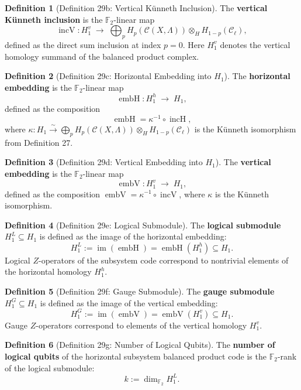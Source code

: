 \documentclass[11pt]{article}
\theoremstyle{plain}
\theoremstyle{definition}
\newtheorem*{definition}{Definition}
\theoremstyle{remark}
\begin{document}
\begin{definition}[Definition 29b: Vertical Künneth Inclusion]
The \textbf{vertical Künneth inclusion} is the $\mathbb{F}_2$-linear map
\[
  \operatorname{incV} : H_1^v \;\longrightarrow\; \bigoplus_{p} H_p(\mathcal{C}(X,\Lambda)) \otimes_H H_{1-p}(\mathcal{C}_\ell),
\]
defined as the direct sum inclusion at index $p = 0$. Here $H_1^v$ denotes the vertical homology summand of the balanced product complex.
\end{definition}

\begin{definition}[Definition 29c: Horizontal Embedding into $H_1$]
The \textbf{horizontal embedding} is the $\mathbb{F}_2$-linear map
\[
  \operatorname{embH} : H_1^h \;\longrightarrow\; H_1,
\]
defined as the composition
\[
  \operatorname{embH} = \kappa^{-1} \circ \operatorname{incH},
\]
where $\kappa : H_1 \xrightarrow{\sim} \bigoplus_p H_p(\mathcal{C}(X,\Lambda)) \otimes_H H_{1-p}(\mathcal{C}_\ell)$ is the Künneth isomorphism from Definition 27.
\end{definition}

\begin{definition}[Definition 29d: Vertical Embedding into $H_1$]
The \textbf{vertical embedding} is the $\mathbb{F}_2$-linear map
\[
  \operatorname{embV} : H_1^v \;\longrightarrow\; H_1,
\]
defined as the composition $\operatorname{embV} = \kappa^{-1} \circ \operatorname{incV}$, where $\kappa$ is the Künneth isomorphism.
\end{definition}

\begin{definition}[Definition 29e: Logical Submodule]
The \textbf{logical submodule} $H_1^L \subseteq H_1$ is defined as the image of the horizontal embedding:
\[
  H_1^L := \operatorname{im}(\operatorname{embH}) = \operatorname{embH}(H_1^h) \subseteq H_1.
\]
Logical $Z$-operators of the subsystem code correspond to nontrivial elements of the horizontal homology $H_1^h$.
\end{definition}

\begin{definition}[Definition 29f: Gauge Submodule]
The \textbf{gauge submodule} $H_1^G \subseteq H_1$ is defined as the image of the vertical embedding:
\[
  H_1^G := \operatorname{im}(\operatorname{embV}) = \operatorname{embV}(H_1^v) \subseteq H_1.
\]
Gauge $Z$-operators correspond to elements of the vertical homology $H_1^v$.
\end{definition}

\begin{definition}[Definition 29g: Number of Logical Qubits]
The \textbf{number of logical qubits} of the horizontal subsystem balanced product code is the $\mathbb{F}_2$-rank of the logical submodule:
\[
  k := \dim_{\mathbb{F}_2} H_1^L.
\]
\end{definition}
\end{document}
